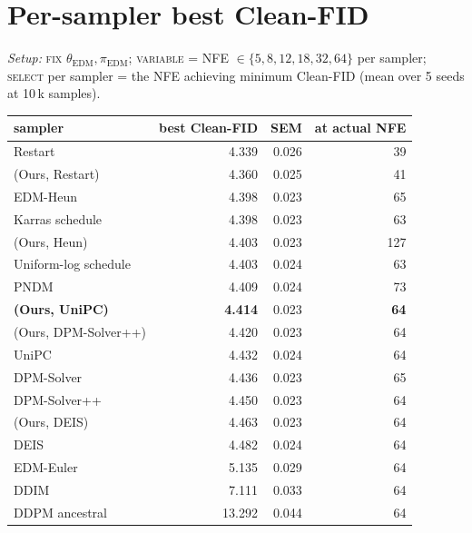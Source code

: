 \documentclass[11pt]{article}
\begin{document}

\section{Per-sampler best Clean-FID}

\noindent\textit{Setup:} \textsc{fix} \(\theta_{\mathrm{EDM}},
\pi_{\mathrm{EDM}}\); \textsc{variable} = NFE \(\in \{5,8,12,18,32,64\}\)
per sampler; \textsc{select} per sampler = the NFE achieving minimum
Clean-FID (mean over 5 seeds at 10\,k samples).

\begin{center}
\small
\begin{tabular}{l r r r}
\toprule
sampler & best Clean-FID & SEM & at actual NFE \\
\midrule
Restart                & 4.339 & 0.026 &  39 \\
(Ours, Restart)        & 4.360 & 0.025 &  41 \\
EDM-Heun               & 4.398 & 0.023 &  65 \\
Karras schedule        & 4.398 & 0.023 &  63 \\
(Ours, Heun)           & 4.403 & 0.023 & 127 \\
Uniform-log schedule   & 4.403 & 0.024 &  63 \\
PNDM                   & 4.409 & 0.024 &  73 \\
\textbf{(Ours, UniPC)} & \textbf{4.414} & 0.023 & \textbf{64} \\
(Ours, DPM-Solver++)   & 4.420 & 0.023 &  64 \\
UniPC                  & 4.432 & 0.024 &  64 \\
DPM-Solver             & 4.436 & 0.023 &  65 \\
DPM-Solver++           & 4.450 & 0.023 &  64 \\
(Ours, DEIS)           & 4.463 & 0.023 &  64 \\
DEIS                   & 4.482 & 0.024 &  64 \\
EDM-Euler              & 5.135 & 0.029 &  64 \\
DDIM                   & 7.111 & 0.033 &  64 \\
DDPM ancestral         &13.292 & 0.044 &  64 \\
\bottomrule
\end{tabular}
\end{center}
\end{document}

